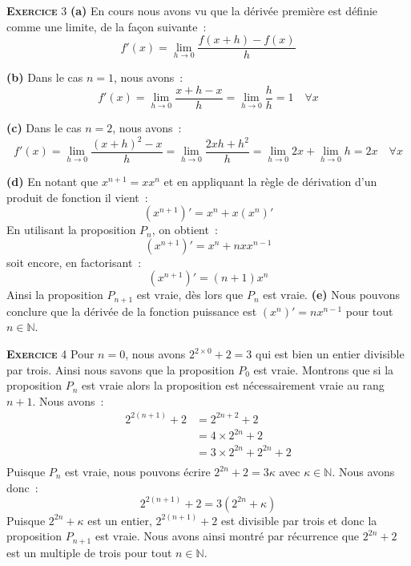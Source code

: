 \documentclass[10pt,a4paper,notitlepage]{article}
\newcommand{\exercice}[1]{\textsc{\textbf{Exercice}} #1}
\begin{document}
\bigskip

\exercice{3} \textbf{(a)} En cours nous avons vu que la dérivée première est définie comme une limite, de la façon suivante :
\[
f'(x) = \lim_{h\rightarrow 0} \frac{f(x+h)-f(x)}{h}
\]

\textbf{(b)} Dans le cas $n=1$, nous avons :
\[
f'(x) = \lim_{h\rightarrow 0} \frac{x+h-x}{h} = \lim_{h\rightarrow 0} \frac{h}{h} = 1\quad \forall x
\]

\textbf{(c)} Dans le cas $n=2$, nous avons :
\[
f'(x) = \lim_{h\rightarrow 0} \frac{(x+h)^2-x}{h} = \lim_{h\rightarrow 0} \frac{2xh+h^2}{h} = \lim_{h\rightarrow 0} 2x + \lim_{h\rightarrow 0} h = 2x \quad \forall x
\]

\textbf{(d)} En notant que $x^{n+1} = x x^n$ et en appliquant la règle de dérivation d'un produit de fonction il vient :
\[
\left(x^{n+1}\right)' = x^n + x \left(x^n\right)'
\]
En utilisant la proposition $P_n$, on obtient :
\[
\left(x^{n+1}\right)' = x^n + n x x^{n-1}
\]
soit encore, en factorisant :
\[
\left(x^{n+1}\right)' = (n+1)x^n
\]
Ainsi la proposition $P_{n+1}$ est vraie, dès lors que $P_n$ est vraie. \textbf{(e)} Nous pouvons conclure que la dérivée de la fonction puissance est $\left(x^n\right)' = n x^{n-1}$ pour tout $n\in\mathbb N$.

\bigskip

\exercice{4} Pour $n=0$, nous avons $2^{2 \times 0}+2 = 3$ qui est bien un entier divisible par trois. Ainsi nous savons que la proposition $P_0$ est vraie. Montrons que si la proposition $P_n$ est vraie alors la proposition est nécessairement vraie au rang $n+1$. Nous avons :
\[
  \begin{split}
    2^{2(n+1)}+2 &= 2^{2n+2} + 2\\
    &= 4 \times 2^{2n} +2\\
    &= 3 \times 2^{2n} + 2^{2n} + 2\\
  \end{split}
\]
Puisque $P_n$ est vraie, nous pouvons écrire $2^{2n}+2=3\kappa$ avec $\kappa\in\mathbb N$. Nous avons donc :
\[
  2^{2(n+1)}+2 = 3 \left(2^{2n} + \kappa \right)
\]
Puisque $2^{2n}+\kappa$ est un entier, $2^{2(n+1)}+2$ est divisible par trois et donc la proposition $P_{n+1}$ est vraie. Nous avons ainsi montré par récurrence que $2^{2n}+2$ est un multiple de trois pour tout $n\in\mathbb N$. 

\bigskip
\end{document}
